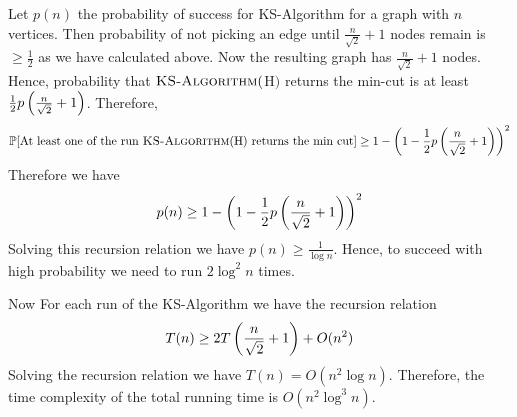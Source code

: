 Let $p(n)$ the probability of success for KS-Algorithm for a graph with $n$ vertices. Then probability of not picking an edge until $\frac{n}{\sqrt{2}}+1$ nodes remain is $\geq \frac12$ as we have calculated above. Now the resulting graph has $\frac{n}{\sqrt{2}}+1$ nodes. Hence, probability that  $\textsc{KS-Algorithm}($H$)$ returns the min-cut is at least $\frac{1}2p\left(\frac{n}{\sqrt{2}}+1\right)$. Therefore, $$\mathbb{P}[\text{At least one of the run $\textsc{KS-Algorithm}($H$)$ returns the min cut}]\geq 1-\left(1-\frac{1}2p\left(\frac{n}{\sqrt{2}}+1\right)\right)^2$$Therefore we have $$p(n)\geq 1-\left(1-\frac{1}2p\left(\frac{n}{\sqrt{2}}+1\right)\right)^2$$Solving this recursion relation we have $p(n)\geq \frac1{\log n}$. Hence, to succeed with high probability we need to run $2\log ^2n$ times. 

Now For each run of the KS-Algorithm we have the recursion relation $$T(n)\geq 2T\left(\frac{n}{\sqrt{2}}+1\right)+O(n^2)$$Solving the recursion relation we have $T(n)=O(n^2\log n)$. Therefore, the time complexity of the total running time is $O(n^2\log ^3n)$.